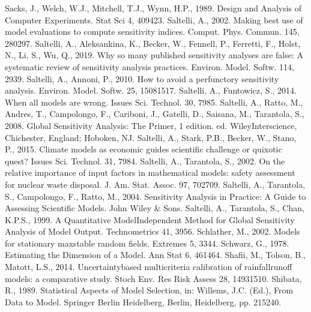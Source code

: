 \documentclass[letterpaper,10pt,english]{sphinxmanual}
\begin{document}
Sacks, J., Welch, W.J., Mitchell, T.J., Wynn, H.P., 1989. Design and Analysis of Computer Experiments. Stat Sci 4, 409\textendash{}423.
Saltelli, A., 2002. Making best use of model evaluations to compute sensitivity indices. Comput. Phys. Commun. 145, 280\textendash{}297.
Saltelli, A., Aleksankina, K., Becker, W., Fennell, P., Ferretti, F., Holst, N., Li, S., Wu, Q., 2019. Why so many published sensitivity analyses are false: A systematic review of sensitivity analysis practices. Environ. Model. Softw. 114, 29\textendash{}39. 
Saltelli, A., Annoni, P., 2010. How to avoid a perfunctory sensitivity analysis. Environ. Model. Softw. 25, 1508\textendash{}1517. 
Saltelli, A., Funtowicz, S., 2014. When all models are wrong. Issues Sci. Technol. 30, 79\textendash{}85.
Saltelli, A., Ratto, M., Andres, T., Campolongo, F., Cariboni, J., Gatelli, D., Saisana, M., Tarantola, S., 2008. Global Sensitivity Analysis: The Primer, 1 edition. ed. Wiley\sphinxhyphen{}Interscience, Chichester, England; Hoboken, NJ.
Saltelli, A., Stark, P.B., Becker, W., Stano, P., 2015. Climate models as economic guides scientific challenge or quixotic quest? Issues Sci. Technol. 31, 79\textendash{}84.
Saltelli, A., Tarantola, S., 2002. On the relative importance of input factors in mathematical models: safety assessment for nuclear waste disposal. J. Am. Stat. Assoc. 97, 702\textendash{}709.
Saltelli, A., Tarantola, S., Campolongo, F., Ratto, M., 2004. Sensitivity Analysis in Practice: A Guide to Assessing Scientific Models. John Wiley \& Sons.
Saltelli, A., Tarantola, S., Chan, K.P.\sphinxhyphen{}S., 1999. A Quantitative Model\sphinxhyphen{}Independent Method for Global Sensitivity Analysis of Model Output. Technometrics 41, 39\textendash{}56. 
Schlather, M., 2002. Models for stationary max\sphinxhyphen{}stable random fields. Extremes 5, 33\textendash{}44.
Schwarz, G., 1978. Estimating the Dimension of a Model. Ann Stat 6, 461\textendash{}464. 
Shafii, M., Tolson, B., Matott, L.S., 2014. Uncertainty\sphinxhyphen{}based multi\sphinxhyphen{}criteria calibration of rainfall\sphinxhyphen{}runoff models: a comparative study. Stoch Env. Res Risk Assess 28, 1493\textendash{}1510. 
Shibata, R., 1989. Statistical Aspects of Model Selection, in: Willems, J.C. (Ed.), From Data to Model. Springer Berlin Heidelberg, Berlin, Heidelberg, pp. 215\textendash{}240. 
\end{document}
